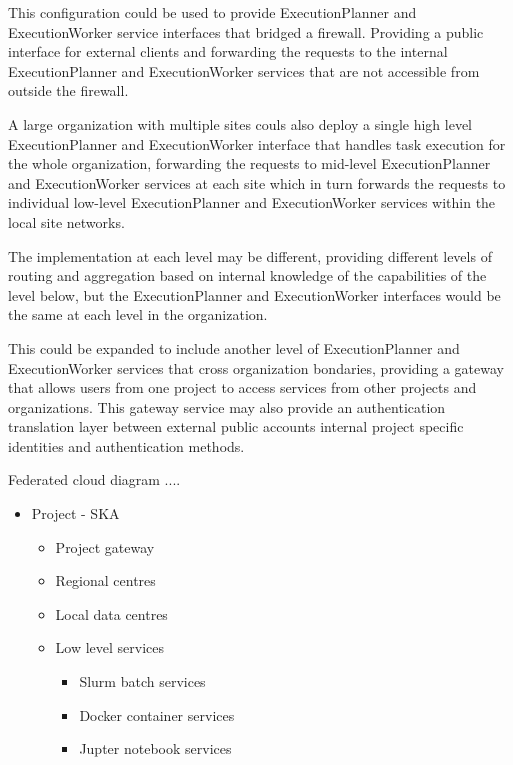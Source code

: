 \documentclass[11pt,a4paper]{ivoa}
\newcommand{\execplanner} {ExecutionPlanner}
\newcommand{\execworker} {ExecutionWorker}
\begin{document}
This configuration could be used to provide \execplanner{} and \execworker{} service interfaces
that bridged a firewall. Providing a public interface for external clients and forwarding the requests
to the internal \execplanner{} and \execworker{} services that are not accessible from outside the
firewall.

A large organization with multiple sites couls also deploy a single high level \execplanner{} and \execworker{}
interface that handles task execution for the whole organization, forwarding the requests to mid-level
\execplanner{} and \execworker{} services at each site which in turn forwards the requests to
individual low-level \execplanner{} and \execworker{} services within the local site networks.

The implementation at each level may be different, providing different levels of routing
and aggregation based on internal knowledge of the capabilities of the level below,
but the \execplanner{} and \execworker{} interfaces would be the same at each level
in the organization.

This could be expanded to include another level of \execplanner{} and \execworker{} services that
cross organization bondaries, providing a gateway that allows users from one project to access services
from other projects and organizations. This gateway service may also provide an authentication translation
layer between external public accounts internal project specific identities and authentication methods.

Federated cloud diagram ....

\begin{itemize}
    \item Project - SKA
    \begin{itemize}
        \item Project gateway
        \item Regional centres
        \item Local data centres
        \item Low level services
        \begin{itemize}
            \item Slurm batch services
            \item Docker container services
            \item Jupter notebook services
        \end{itemize}
    \end{itemize}
\end{itemize}
\end{document}
